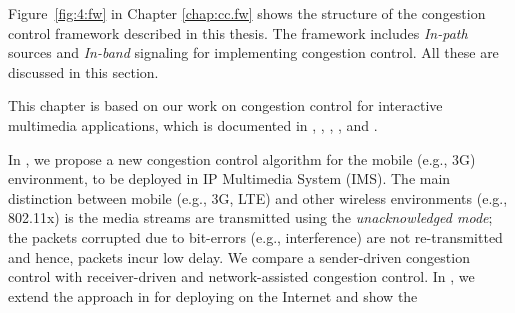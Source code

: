 Figure~\ref{fig:4:fw} in Chapter \ref{chap:cc.fw} shows the structure of the
congestion control framework described in this thesis. The framework includes
\emph{In-path} sources and \emph{In-band} signaling for implementing
congestion control. All these are discussed in this section.

This chapter is based on our work on congestion control for interactive
multimedia applications, which is documented in ,
, , \cite{draft.xr.discard.rle},
\cite{draft.xr.discard} and \cite{Singh:control.loops.api}.

In , we propose a new congestion control algorithm for the
mobile (e.g., 3G) environment, to be deployed in IP Multimedia System (IMS).
The main distinction between mobile (e.g., 3G, LTE) and other wireless
environments (e.g., 802.11x) is the media streams are transmitted using the
\emph{unacknowledged mode}; the packets corrupted due to bit-errors (e.g.,
interference) are not re-transmitted and hence, packets incur low delay. We
compare a sender-driven congestion control with receiver-driven and
network-assisted congestion control. In , we extend the
approach in  for deploying on the Internet and show the 